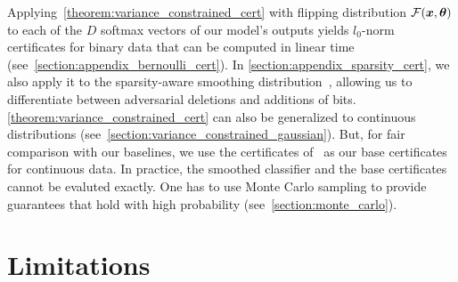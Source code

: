 \documentclass{article} %
\theoremstyle{plain}
\theoremstyle{definition}
\theoremstyle{remark}
\begin{document}
Applying~\autoref{theorem:variance_constrained_cert} with flipping distribution $\mathcal{F}({\bm{x}}, {\bm{\theta}})$ to each of the $D$ softmax vectors of our model's outputs
yields $l_0$-norm certificates for binary data 
that can be computed in linear time (see~\autoref{section:appendix_bernoulli_cert}).
In \autoref{section:appendix_sparsity_cert}, we also apply it to the sparsity-aware smoothing distribution~\citep{Bojchevski2020}, allowing us to differentiate between adversarial deletions and additions of bits.
\autoref{theorem:variance_constrained_cert} can also be generalized to continuous distributions (see~\autoref{section:variance_constrained_gaussian}). But, for fair comparison with our baselines, we use the certificates of~\cite{Eiras2021} as our base certificates for continuous data.
In practice, the smoothed classifier and the base certificates cannot be evaluted exactly. One has to use Monte Carlo sampling to provide  guarantees that hold with high probability (see~\autoref{section:monte_carlo}).

\section{Limitations}\label{section:limitations}
\end{document}
